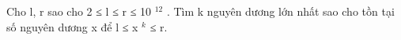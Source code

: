 Cho l, r sao cho 2 ≤ l ≤ r ≤ 10   $^    12   $   . Tìm k nguyên dương lớn nhất sao cho tồn tại số nguyên dương x để l ≤ x   $^    k   $   ≤ r.  

\